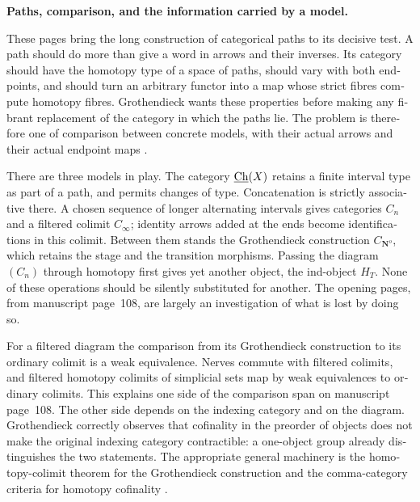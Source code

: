 \begin{otherlanguage}{english}
\begingroup
{}
\noindent\textbf{Paths, comparison, and the information carried by a model.}

These pages bring the long construction of categorical paths to its decisive
test.  A path should do more than give a word in arrows and their inverses.  Its
category should have the homotopy type of a space of paths, should vary with
both endpoints, and should turn an arbitrary functor into a map whose strict
fibres compute homotopy fibres.  Grothendieck wants these properties before
making any fibrant replacement of the category in which the paths lie.  The
problem is therefore one of comparison between concrete models, with their
actual arrows and their actual endpoint maps
\citep[ms.~108--171]{GrothendieckDerivateursVII}.

There are three models in play.  The category $\underline{\mathrm{Ch}}(X)$ retains a finite interval
type as part of a path, and permits changes of type.  Concatenation is strictly
associative there.  A chosen sequence of longer alternating intervals gives
categories $C_n$ and a filtered colimit $C_\infty$; identity arrows added at the
ends become identifications in this colimit.  Between them stands the
Grothendieck construction $C_{\mathbf N^o}$, which retains the stage and the
transition morphisms.  Passing the diagram $(C_n)$ through homotopy first gives
yet another object, the ind-object $H_T$.  None of these operations should be
silently substituted for another.  The opening pages, from manuscript page~108, are largely
an investigation of what is lost by doing so.

For a filtered diagram the comparison from its Grothendieck construction to
its ordinary colimit is a weak equivalence.  Nerves commute with filtered
colimits, and filtered homotopy colimits of simplicial sets map by weak
equivalences to ordinary colimits.  This explains one side of the comparison
span on manuscript page~108.  The other side depends on the indexing category
and on the diagram.  Grothendieck correctly observes that cofinality in the
preorder of objects does not make the original indexing category contractible:
a one-object group already distinguishes the two statements.  The appropriate
general machinery is the homotopy-colimit theorem for the Grothendieck
construction and the comma-category criteria for homotopy cofinality
\citep{Thomason1979,Quillen1973}.


\end{otherlanguage}
